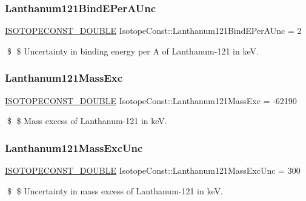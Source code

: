 \subsubsection{\texorpdfstring{Lanthanum121\+Bind\+E\+Per\+A\+Unc}{Lanthanum121BindEPerAUnc}}
{\footnotesize\ttfamily \mbox{\hyperlink{group___isotope_const-_macros_ga8f45a7272ce02c0b4c65c44636ed719a}{I\+S\+O\+T\+O\+P\+E\+C\+O\+N\+S\+T\+\_\+\+D\+O\+U\+B\+LE}} Isotope\+Const\+::\+Lanthanum121\+Bind\+E\+Per\+A\+Unc = 2}

\$ \$ Uncertainty in binding energy per A of Lanthanum-\/121 in keV. \mbox{\label{group___isotope_const-_lanthanum-_la121_ga52923f8578c686170efe9ca7caf08cfd}} 
\subsubsection{\texorpdfstring{Lanthanum121\+Mass\+Exc}{Lanthanum121MassExc}}
{\footnotesize\ttfamily \mbox{\hyperlink{group___isotope_const-_macros_ga8f45a7272ce02c0b4c65c44636ed719a}{I\+S\+O\+T\+O\+P\+E\+C\+O\+N\+S\+T\+\_\+\+D\+O\+U\+B\+LE}} Isotope\+Const\+::\+Lanthanum121\+Mass\+Exc = -\/62190}

\$ \$ Mass excess of Lanthanum-\/121 in keV. \mbox{\label{group___isotope_const-_lanthanum-_la121_ga23b173098d3d03f8747db43f21c887b8}} 
\subsubsection{\texorpdfstring{Lanthanum121\+Mass\+Exc\+Unc}{Lanthanum121MassExcUnc}}
{\footnotesize\ttfamily \mbox{\hyperlink{group___isotope_const-_macros_ga8f45a7272ce02c0b4c65c44636ed719a}{I\+S\+O\+T\+O\+P\+E\+C\+O\+N\+S\+T\+\_\+\+D\+O\+U\+B\+LE}} Isotope\+Const\+::\+Lanthanum121\+Mass\+Exc\+Unc = 300}

\$ \$ Uncertainty in mass excess of Lanthanum-\/121 in keV. \mbox{\label{group___isotope_const-_lanthanum-_la121_ga39b68b9ba4e126e84f290405ec5ed2cc}} 
